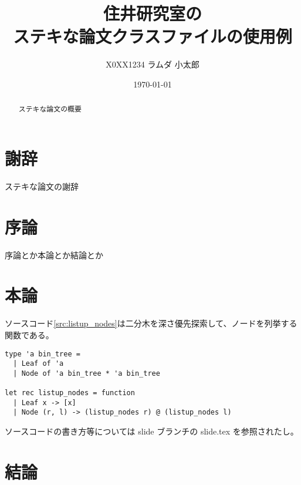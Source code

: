 \documentclass{sumiilab-paper}
\title{住井研究室の\\ステキな論文クラスファイルの使用例}
\author{X0XX1234 ラムダ 小太郎}
\institute{東北大学 工学部\\情報知能システム総合学科}%
\date{\today}
\begin{document}
\maketitle

\begin{abstract}
ステキな論文の概要
\end{abstract}

\chapter*{謝辞}

ステキな論文の謝辞

\tableofcontents


\chapter{序論}

序論とか本論とか結論とか \cite{TAPL}

\chapter{本論}

ソースコード\ref{src:listup_nodes}は二分木を深さ優先探索して、ノードを列挙する関数である。
\begin{lstlisting}[caption=二分木のノードのリストアップ,label=src:listup_nodes]
type 'a bin_tree =
  | Leaf of 'a
  | Node of 'a bin_tree * 'a bin_tree

let rec listup_nodes = function
  | Leaf x -> [x]
  | Node (r, l) -> (listup_nodes r) @ (listup_nodes l)
\end{lstlisting}
ソースコードの書き方等については slide ブランチの slide.tex を参照されたし。

\chapter{結論}



\end{document}
